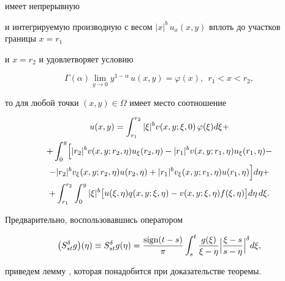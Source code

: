 {имеет непрерывную

и интегрируемую производную с весом $|x|^{b}\,u_x(x,y)$ вплоть до участков границы $x=r_1$

и $x=r_2$ и удовлетворяет условию 

\begin{equation}\label{Glava-2-1-(5)}

\Gamma(\alpha)\lim_{y \to 0} y^{1-\alpha}\,u(x,y)=\varphi(x), \ \ r_1 < x < r_2,

\end{equation}

то для любой точки $(x,y)\in \Omega$ имеет место соотношение

\begin{multline}

\label{G4}

u(x,y)=\int _{r_1}^{r_2} |\xi|^{b} v(x,y;\xi,0)\,\varphi(\xi) d\xi+

\\

+\int _{0}^{y} 

\Bigl[|r_{2}|^{b} v(x,y;r_2,\eta) u_{\xi}(r_2,\eta)-|r_{1}|^{b} v(x,y;r_1,\eta) u_{\xi}(r_1,\eta)- 

\\

 -|r_{2}|^{b} v_{\xi}(x,y;r_2,\eta) u(r_2,\eta)+|r_{1}|^{b} v_{\xi}(x,y;r_1,\eta) u(r_1,\eta) \Bigr] d\eta+

\\

+ \int _{r_1}^{r_2} \int _{0}^{y}

|\xi|^{b}\bigl[u(\xi,\eta) q(x,y;\xi,\eta)-v(x,y;\xi,\eta)f(\xi,\eta)\bigr] d\eta\,d\xi.

\end{multline}

}



\smallskip



Предварительно,  воспользовавшись оператором

$$

\bigl( S_{st}^{\delta} g \bigr)(\eta) \equiv S_{st}^{\delta} g(\eta)=

\frac{\text{sign}(t-s)}{\pi}\int _{s}^{t}\frac{g(\xi)}{\xi-\eta}

\Bigl| \frac{\xi-s}{s-\eta} \Bigr|^{\delta}d\xi,

$$ 

приведем лемму \cite[c. 118]{Pskhu}, которая понадобится при доказательстве теоремы.





